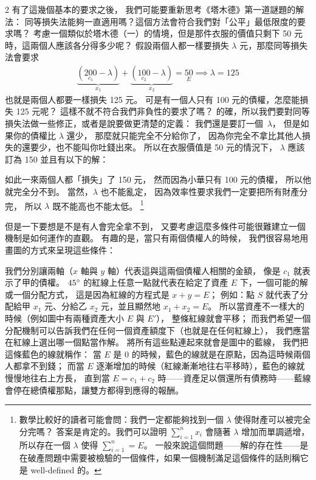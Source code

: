 \documentclass[10pt]{article}
\begin{document}
\begin{multicols*}{2}
有了這幾個基本的要求之後，
我們可能要重新思考《塔木德》第一道謎題的解法：
\textsf{同等損失法}能夠一直適用嗎？這個方法會符合我們對「公平」最低限度的要求嗎？
考慮一個類似於\textsf{塔木德（一）}的情境，但是那件衣服的價值只剩下 50 元時，這兩個人應該各分得多少呢？
假設兩個人都一樣要損失 $\lambda$ 元，那麼\textsf{同等損失法}會要求
\begin{align*}
	\underbrace{ \left( \underset{c_1}{200} - \lambda \right) }_{x_1}
	+
	\underbrace{ \left( \underset{c_2}{100} - \lambda \right) }_{x_2}
	= \underset{E}{50}
	\implies \lambda = 125
\end{align*}
也就是兩個人都要一樣損失 125 元。
可是有一個人只有 100 元的債權，怎麼能損失 125 元呢？
這樣不就不符合我們\textsf{非負性}的要求了嗎？
的確，所以我們要對\textsf{同等損失法}做一些修正，或者是說要做更清楚的定義：
我們還是要訂一個\ $\lambda$，
但是如果你的債權比 $\lambda$ 還少，
那麼就只能完全不分給你了，
因為你完全不拿比其他人損失的還要少，也不能叫你吐錢出來。
所以在衣服價值是 50 元的情況下，
$\lambda$ 應該訂為 150 並且有以下的解：

如此一來兩個人都「損失」了 150 元，
然而因為小華只有 100 元的債權，
所以他就完全分不到。
當然，$\lambda$ 也不能亂定，
因為\textsf{效率性}要求我們一定要把所有財產分完，
所以 $\lambda$ 既不能高也不能太低。
\footnote{數學比較好的讀者可能會問：我們一定都能夠找到一個 $\lambda$ 使得財產可以被完全分完嗎？
答案是肯定的。我們可以證明 $\sum_{i=1}^nx_i$ 會隨著 $\lambda$ 增加而單調遞增，
所以存在一個 $\lambda$ 使得 $\sum_{i=1}^n=E$。
一般來說這個問題——解的存在性——是在破產問題中需要被檢驗的一個條件，如果一個機制滿足這個條件的話則稱它是 well-defined 的。}

但是一下要想是不是有人會完全拿不到，
又要考慮這麼多條件可能很難建立一個機制是如何運作的直觀。
有趣的是，當只有兩個債權人的時候，
我們很容易地用畫圖的方式來呈現這些條件：

我們分別讓兩軸（$x$ 軸與 $y$ 軸）代表這與這兩個債權人相關的金額，
像是 $c_1$ 就表示了甲的債權。
$45\degree$ 的紅線上任意一點就代表在給定了資產 $E$ 下，一個可能的解或一個分配方式，
這是因為紅線的方程式是 $x + y = E$；
例如：點 $S$ 就代表了分配給甲 $x_1$ 元、分給乙 $x_2$ 元，並且顯然地 $x_1+x_2=E$。
所以當資產不一樣大的時候（例如圖中有兩種資產大小 $E$ 與 $E'$），
整條紅線就會平移；
而我們希望一個分配機制可以告訴我們在任何一個資產額度下（也就是在任何紅線上），
我們應當在紅線上選出哪一個點當作解。
將所有這些點連起來就會是圖中的藍線，
我們把這條藍色的線就稱作：
當 $E$ 是 0 的時候，藍色的線就是在原點，因為這時候兩個人都拿不到錢；
而當 $E$ 逐漸增加的時候（紅線漸漸地往右平移時），藍色的線就慢慢地往右上方長，
直到當 $E=c_1+c_2$ 時——資產足以償還所有債務時——藍線會停在總債權那點，讓雙方都得到應得的報酬。


\end{multicols*}
\end{document}
